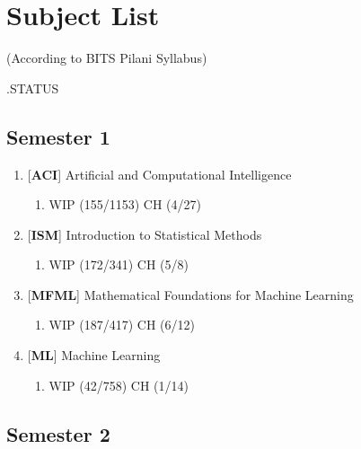 \chapter*{Subject List}

\begin{center}
(According to BITS Pilani Syllabus)
\end{center}

.\hfill STATUS

\section*{Semester 1}
\begin{enumerate}[series=sublist]
    \item {[\textbf{ACI}]} Artificial and Computational Intelligence
        \begin{enumerate}
            \item {}
            \hfill WIP (155/1153) CH (4/27)
        \end{enumerate}

    \item {[\textbf{ISM}]} Introduction to Statistical Methods
        \begin{enumerate}
            \item {}
            \hfill WIP (172/341) CH (5/8)
        \end{enumerate}

    \item {[\textbf{MFML}]} Mathematical Foundations for Machine Learning
        \begin{enumerate}
            \item {}
            \hfill WIP (187/417) CH (6/12)
        \end{enumerate}

    \item {[\textbf{ML}]} Machine Learning
        \begin{enumerate}
            \item {}
            \hfill WIP (42/758) CH (1/14)
        \end{enumerate}
\end{enumerate}


\section*{Semester 2}


